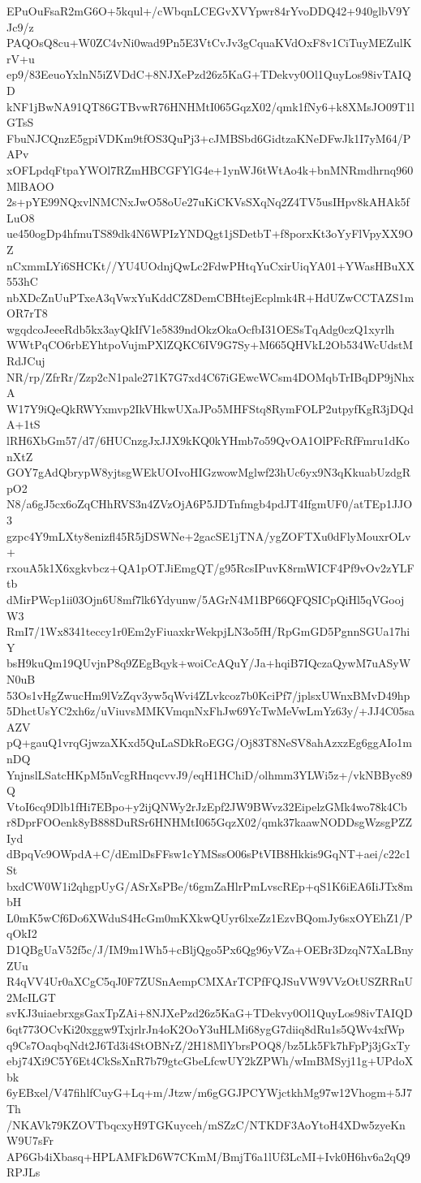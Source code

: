 EPuOuFsaR2mG6O+5kqul+/cWbqnLCEGvXVYpwr84rYvoDDQ42+940glbV9YJc9/z
PAQOsQ8cu+W0ZC4vNi0wad9Pn5E3VtCvJv3gCquaKVdOxF8v1CiTuyMEZulKrV+u
ep9/83EeuoYxlnN5iZVDdC+8NJXePzd26z5KaG+TDekvy0Ol1QuyLos98ivTAIQD
kNF1jBwNA91QT86GTBvwR76HNHMtI065GqzX02/qmk1fNy6+k8XMsJO09T1lGTsS
FbuNJCQnzE5gpiVDKm9tfOS3QuPj3+cJMBSbd6GidtzaKNeDFwJk1I7yM64/PAPv
xOFLpdqFtpaYWOl7RZmHBCGFYlG4e+1ynWJ6tWtAo4k+bnMNRmdhrnq960MlBAOO
2s+pYE99NQxvlNMCNxJwO58oUe27uKiCKVsSXqNq2Z4TV5usIHpv8kAHAk5fLuO8
ue450ogDp4hfmuTS89dk4N6WPIzYNDQgt1jSDetbT+f8porxKt3oYyFlVpyXX9OZ
nCxmmLYi6SHCKt//YU4UOdnjQwLc2FdwPHtqYuCxirUiqYA01+YWasHBuXX553hC
nbXDcZnUuPTxeA3qVwxYuKddCZ8DemCBHtejEcplmk4R+HdUZwCCTAZS1mOR7rT8
wgqdcoJeeeRdb5kx3ayQkIfV1e5839ndOkzOkaOcfbI31OESsTqAdg0czQ1xyrlh
WWtPqCO6rbEYhtpoVujmPXlZQKC6IV9G7Sy+M665QHVkL2Ob534WcUdstMRdJCuj
NR/rp/ZfrRr/Zzp2cN1pale271K7G7xd4C67iGEwcWCsm4DOMqbTrIBqDP9jNhxA
W17Y9iQeQkRWYxmvp2IkVHkwUXaJPo5MHFStq8RymFOLP2utpyfKgR3jDQdA+1tS
lRH6XbGm57/d7/6HUCnzgJxJJX9kKQ0kYHmb7o59QvOA1OlPFcRfFmru1dKonXtZ
GOY7gAdQbrypW8yjtsgWEkUOIvoHIGzwowMglwf23hUc6yx9N3qKkuabUzdgRpO2
N8/a6gJ5cx6oZqCHhRVS3n4ZVzOjA6P5JDTnfmgb4pdJT4IfgmUF0/atTEp1JJO3
gzpc4Y9mLXty8enizfl45R5jDSWNe+2gacSE1jTNA/ygZOFTXu0dFlyMouxrOLv+
rxouA5k1X6xgkvbcz+QA1pOTJiEmgQT/g95RcsIPuvK8rmWICF4Pf9vOv2zYLFtb
dMirPWcp1ii03Ojn6U8mf7lk6Ydyunw/5AGrN4M1BP66QFQSICpQiHl5qVGoojW3
RmI7/1Wx8341teccy1r0Em2yFiuaxkrWekpjLN3o5fH/RpGmGD5PgnnSGUa17hiY
bsH9kuQm19QUvjnP8q9ZEgBqyk+woiCcAQuY/Ja+hqiB7IQczaQywM7uASyWN0uB
53Os1vHgZwucHm9lVzZqv3yw5qWvi4ZLvkcoz7b0KciPf7/jplsxUWnxBMvD49hp
5DhctUsYC2xh6z/uViuvsMMKVmqnNxFhJw69YcTwMeVwLmYz63y/+JJ4C05saAZV
pQ+gauQ1vrqGjwzaXKxd5QuLaSDkRoEGG/Oj83T8NeSV8ahAzxzEg6ggAIo1mnDQ
YnjnslLSatcHKpM5nVcgRHnqcvvJ9/eqH1HChiD/olhmm3YLWi5z+/vkNBByc89Q
VtoI6cq9Dlb1fHi7EBpo+y2ijQNWy2rJzEpf2JW9BWvz32EipelzGMk4wo78k4Cb
r8DprFOOenk8yB888DuRSr6HNHMtI065GqzX02/qmk37kaawNODDsgWzsgPZZIyd
dBpqVc9OWpdA+C/dEmlDsFFsw1cYMSssO06sPtVIB8Hkkis9GqNT+aei/c22c1St
bxdCW0W1i2qhgpUyG/ASrXsPBe/t6gmZaHlrPmLvscREp+qS1K6iEA6IiJTx8mbH
L0mK5wCf6Do6XWduS4HcGm0mKXkwQUyr6lxeZz1EzvBQomJy6sxOYEhZ1/PqOkI2
D1QBgUaV52f5c/J/IM9m1Wh5+cBljQgo5Px6Qg96yVZa+OEBr3DzqN7XaLBnyZUu
R4qVV4Ur0aXCgC5qJ0F7ZUSnAempCMXArTCPfFQJSuVW9VVzOtUSZRRnU2McILGT
svKJ3uiaebrxgsGaxTpZAi+8NJXePzd26z5KaG+TDekvy0Ol1QuyLos98ivTAIQD
6qt773OCvKi20xggw9TxjrlrJn4oK2OoY3uHLMi68ygG7diiq8dRu1s5QWv4xfWp
q9Cs7OaqbqNdt2J6Td3i4StOBNrZ/2H18MlYbrsPOQ8/bz5Lk5Fk7hFpPj3jGxTy
ebj74Xi9C5Y6Et4CkSsXnR7b79gtcGbeLfcwUY2kZPWh/wImBMSyj11g+UPdoXbk
6yEBxel/V47fihlfCuyG+Lq+m/Jtzw/m6gGGJPCYWjctkhMg97w12Vhogm+5J7Th
/NKAVk79KZOVTbqcxyH9TGKuyceh/mSZzC/NTKDF3AoYtoH4XDw5zyeKnW9U7sFr
AP6Gb4iXbasq+HPLAMFkD6W7CKmM/BmjT6a1lUf3LcMI+Ivk0H6hv6a2qQ9RPJLs
